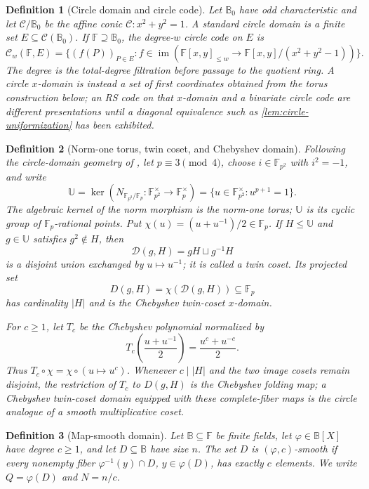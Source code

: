 \documentclass[11pt,a4paper]{amsart}
\numberwithin{equation}{section}
\newtheorem{definition}[definition]{Definition}
\theoremstyle{remark}
\newcommand{\F}{\mathbb F}
\newcommand{\B}{\mathbb B}
\newcommand{\Dcal}{\mathcal D}
\newcommand{\UU}{\mathbb U}
\newcommand{\abs}[1]{\lvert #1\rvert}
\begin{document}
\begin{definition}[Circle domain and circle code]
\label{def:circle-domain-code}
Let \(\B_0\) have odd characteristic and let
\(\mathcal C/\B_0\) be the affine conic
\(\mathcal C:x^2+y^2=1\).  A \emph{standard circle domain} is a finite
set \(E\subseteq\mathcal C(\B_0)\).  If \(\F\supseteq\B_0\), the
degree-\(w\) \emph{circle code} on \(E\) is
\[
 \mathcal C_w(\F,E)
 =\{(f(P))_{P\in E}:
      f\in\operatorname{im}(\F[x,y]_{\le w}
          \to\F[x,y]/(x^2+y^2-1))\}.
\]
The degree is the total-degree filtration before passage to the quotient
ring.  A \emph{circle \(x\)-domain} is instead a set of first
coordinates obtained from the torus construction below; an RS code on
that \(x\)-domain and a bivariate circle code are different presentations
until a diagonal equivalence such as
\cref{lem:circle-uniformization} has been exhibited.
\end{definition}

\begin{definition}[Norm-one torus, twin coset, and Chebyshev domain]
\label{def:circle-twin-domain}
Following the circle-domain geometry of \cite{HLP24}, let
\(p\equiv3\pmod4\), choose \(i\in\F_{p^2}\) with \(i^2=-1\), and
write
\[
 \UU=\ker\!\left(N_{\F_{p^2}/\F_p}:\F_{p^2}^{\times}
                      \to\F_p^\times\right)
     =\{u\in\F_{p^2}^{\times}:u^{p+1}=1\}.
\]
The algebraic kernel of the norm morphism is the
\emph{norm-one torus}; \(\UU\) is its cyclic group of
\(\F_p\)-rational points.  Put
\(\chi(u)=(u+u^{-1})/2\in\F_p\).  If \(H\le\UU\) and
\(g\in\UU\) satisfies \(g^2\notin H\), then
\[
 \Dcal(g,H)=gH\sqcup g^{-1}H
\]
is a disjoint union exchanged by \(u\mapsto u^{-1}\); it is called a
\emph{twin coset}.  Its projected set
\[
             D(g,H)=\chi(\Dcal(g,H))\subseteq\F_p
\]
has cardinality \(\abs H\) and is the \emph{Chebyshev twin-coset
\(x\)-domain}.

For \(c\ge1\), let \(T_c\) be the Chebyshev polynomial normalized by
\[
       T_c\!\left(\frac{u+u^{-1}}2\right)
       =\frac{u^c+u^{-c}}2 .
\]
Thus \(T_c\circ\chi=\chi\circ(u\mapsto u^c)\).  Whenever
\(c\mid\abs H\) and the two image cosets remain disjoint, the restriction
of \(T_c\) to \(D(g,H)\) is the \emph{Chebyshev folding map}; a
Chebyshev twin-coset domain equipped with these complete-fiber maps is
the circle analogue of a smooth multiplicative coset.
\end{definition}

\begin{definition}[Map-smooth domain]\label{def:map-smooth}
Let \(\B\subseteq\F\) be finite fields, let \(\varphi\in\B[X]\) have
degree \(c\ge1\), and let \(D\subseteq\B\) have size \(n\).  The set
\(D\) is \((\varphi,c)\)-smooth if every nonempty fiber
\(\varphi^{-1}(y)\cap D\), \(y\in\varphi(D)\), has exactly \(c\)
elements.  We write \(Q=\varphi(D)\) and \(N=n/c\).
\end{definition}
\end{document}
